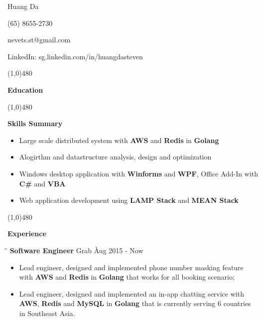 \documentclass{article}
\begin{document}
\centerline{{\Huge \sc Huang Da} }
\centerline{(65) 8655-2730}
\centerline{nevets.st@gmail.com}
\centerline{LinkedIn: sg.linkedin.com/in/huangdasteven}

\noindent

\centerline{\line(1,0){480}}

\medskip

\centerline {\Large \bf Education}

\smallskip


\centerline{\line(1,0){480}}

\medskip

\centerline {\Large \bf {Skills Summary}}

\vspace{-6pt}\smallskip

\begin{itemize}[leftmargin=*]
  \item Large scale distributed system with {\bf AWS} and {\bf Redis} in {\bf Golang} \vspace{-6pt}
  \item Alogirthm and datastructure analysis, design and optimization \vspace{-6pt}
  \item Windows desktop application with {\bf Winforms} and {\bf WPF}, Office Add-In with {\bf C\#}  and {\bf VBA}\vspace{-6pt}
  \item Web application development using {\bf LAMP Stack} and {\bf MEAN Stack} \vspace{-6pt}
\end{itemize}

\centerline{\line(1,0){480}}

\medskip

\centerline {\Large \bf Experience}

\medskip


\begin{tabbing}
\hspace{2.9in}\= \hspace{2.6in}\= \kill
{\bf Software Engineer} \> Grab \`Aug 2015 - Now\
\end{tabbing}

\begin{itemize}
    \item Lead engineer, designed and implemented phone number masking feature with {\bf AWS} and {\bf Redis} in {\bf Golang} that works for all booking scenario; \vspace{-6pt}
    \item Lead engineer, designed and implemented an in-app chatting service with {\bf AWS}, {\bf Redis} and {\bf MySQL} in {\bf Golang} that is currently serving 6 countries in Southeast Asia.
\end{itemize}
\end{document}
